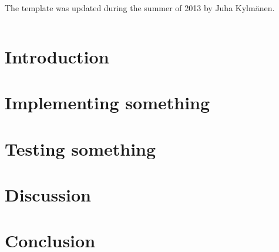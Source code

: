 \documentclass[a4paper, 12pt,titlepage]{dithesis}
\begin{document}
The template was updated during the summer of 2013 by Juha Kylmänen.


\setlongtables
\begin{longtable}[l]{p{3cm}l}



\end{longtable}
\setcounter{table}{0}

\chapter{Introduction}
\sivunumerot

\chapter{Implementing something}

\chapter{Testing something}

\chapter{Discussion}

\chapter{Conclusion}



\end{document}

